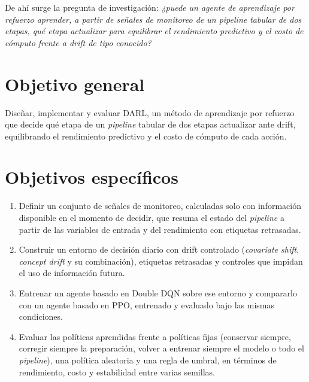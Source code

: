 De ahí surge la pregunta de investigación: \textit{¿puede un agente de aprendizaje por
    refuerzo aprender, a partir de señales de monitoreo de un \textit{pipeline} tabular de dos
    etapas, qué etapa actualizar para equilibrar el rendimiento predictivo y el costo de
    cómputo frente a drift de tipo conocido?}



\section*{Objetivo general}

Diseñar, implementar y evaluar DARL, un método de aprendizaje por refuerzo que decide qué
etapa de un \textit{pipeline} tabular de dos etapas actualizar ante drift, equilibrando el
rendimiento predictivo y el costo de cómputo de cada acción.

\section*{Objetivos específicos}

\begin{enumerate}
    \item Definir un conjunto de señales de monitoreo, calculadas solo con información
          disponible en el momento de decidir, que resuma el estado del \textit{pipeline} a partir
          de las variables de entrada y del rendimiento con etiquetas retrasadas.

    \item Construir un entorno de decisión diario con drift controlado
          (\textit{covariate shift}, \textit{concept drift} y su combinación), etiquetas
          retrasadas y controles que impidan el uso de información futura.

    \item Entrenar un agente basado en Double DQN sobre ese entorno y compararlo con un
          agente basado en PPO, entrenado y evaluado bajo las mismas condiciones.

    \item Evaluar las políticas aprendidas frente a políticas fijas (conservar siempre,
          corregir siempre la preparación, volver a entrenar siempre el modelo o todo el
          \textit{pipeline}), una política aleatoria y una regla de umbral, en términos de
          rendimiento, costo y estabilidad entre varias semillas.
\end{enumerate}


